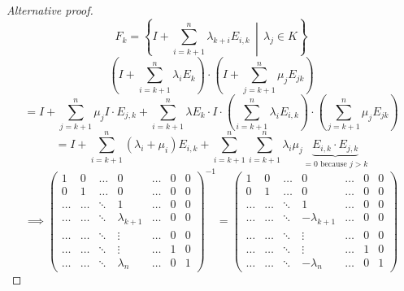 \documentclass[a4paper,landscape,twocolumn]{article}
\newcommand\setdef[2]{\left\{#1\,\middle|\,#2\right\}}
\begin{document}
\begin{proof}[Alternative proof]
  \[ F_k = \setdef{I + \sum_{i=k+1}^n \lambda_{k+i} E_{i,k}}{\lambda_j \in K} \]
  \[ \left(I + \sum_{i=k+1}^n \lambda_i E_k\right) \cdot \left(I + \sum_{j=k+1}^{n} \mu_j E_{jk}\right) \]
  \[
    = I + \sum_{j=k+1}^{n} \mu_j I \cdot E_{j,k} + \sum_{i=k+1}^n \lambda E_k \cdot I
    \cdot \left(\sum_{i=k+1}^{n} \lambda_i E_{i,k}\right) \cdot
    \left(\sum_{j=k+1}^{n} \mu_j E_{jk}\right)
  \] \[
    = I + \sum_{i=k+1}^n \left(\lambda_i + \mu_i\right) E_{i,k} + \sum_{i=k+1}^n \sum_{i=k+1}^n \lambda_i \mu_j \underbrace{E_{i,k} \cdot E_{j,k}}_{=0 \text{ because } j > k}
  \]
  \[
    \implies
    \begin{pmatrix}
      1 & 0 & \ldots & 0 & \ldots & 0 & 0 \\
      0 & 1 & \ldots & 0 & \ldots & 0 & 0 \\
      \ldots & \ldots & \ddots & 1 & \ldots & 0 & 0 \\
      \ldots & \ldots & \ddots & \lambda_{k+1} & \ldots & 0 & 0 \\
      \ldots & \ldots & \ddots & \vdots & \ldots & 0 & 0 \\
      \ldots & \ldots & \ddots & \vdots & \ldots & 1 & 0 \\
      \ldots & \ldots & \ddots & \lambda_n & \ldots & 0 & 1
    \end{pmatrix}^{-1}
    =
    \begin{pmatrix}
      1 & 0 & \ldots & 0 & \ldots & 0 & 0 \\
      0 & 1 & \ldots & 0 & \ldots & 0 & 0 \\
      \ldots & \ldots & \ddots & 1 & \ldots & 0 & 0 \\
      \ldots & \ldots & \ddots & -\lambda_{k+1} & \ldots & 0 & 0 \\
      \ldots & \ldots & \ddots & \vdots & \ldots & 0 & 0 \\
      \ldots & \ldots & \ddots & \vdots & \ldots & 1 & 0 \\
      \ldots & \ldots & \ddots & -\lambda_n & \ldots & 0 & 1
    \end{pmatrix}
  \]
\end{proof}
\end{document}
